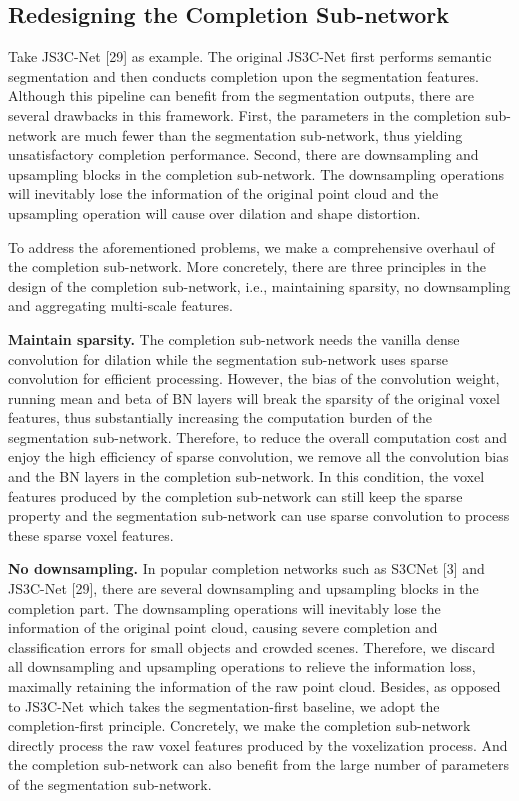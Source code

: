 \documentclass[10pt,twocolumn,letterpaper]{article}
\begin{document}
\subsection{Redesigning the Completion Sub-network}

Take JS3C-Net [29] as example. The original JS3C-Net first performs semantic segmentation and then conducts completion upon the segmentation features. Although this pipeline can benefit from the segmentation outputs, there are several drawbacks in this framework. First, the parameters in the completion sub-network are much fewer than the segmentation sub-network, thus yielding unsatisfactory completion performance. Second, there are downsampling and upsampling blocks in the completion sub-network. The downsampling operations will inevitably lose the information of the original point cloud and the upsampling operation will cause over dilation and shape distortion.

To address the aforementioned problems, we make a comprehensive overhaul of the completion sub-network. More concretely, there are three principles in the design of the completion sub-network, i.e., maintaining sparsity, no downsampling and aggregating multi-scale features.

\textbf{Maintain sparsity.}
The completion sub-network needs the vanilla dense convolution for dilation while the segmentation sub-network uses sparse convolution for efficient processing. However, the bias of the convolution weight, running mean and beta of BN layers will break the sparsity of the original voxel features, thus substantially increasing the computation burden of the segmentation sub-network. Therefore, to reduce the overall computation cost and enjoy the high efficiency of sparse convolution, we remove all the convolution bias and the BN layers in the completion sub-network. In this condition, the voxel features produced by the completion sub-network can still keep the sparse property and the segmentation sub-network can use sparse convolution to process these sparse voxel features.

\textbf{No downsampling.}
In popular completion networks such as S3CNet [3] and JS3C-Net [29], there are several downsampling and upsampling blocks in the completion part. The downsampling operations will inevitably lose the information of the original point cloud, causing severe completion and classification errors for small objects and crowded scenes. Therefore, we discard all downsampling and upsampling operations to relieve the information loss, maximally retaining the information of the raw point cloud. Besides, as opposed to JS3C-Net which takes the segmentation-first baseline, we adopt the completion-first principle. Concretely, we make the completion sub-network directly process the raw voxel features produced by the voxelization process. And the completion sub-network can also benefit from the large number of parameters of the segmentation sub-network.
\end{document}
